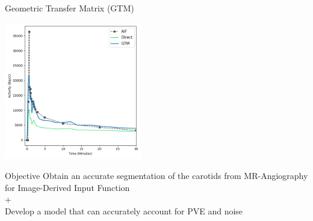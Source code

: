 \documentclass[aspectratio=169]{beamer}
\begin{document}
\begin{frame}[t]{Geometric Transfer Matrix (GTM)}
	\centering
	\begin{center}
		\includegraphics[height=6cm]{BADKA07504_1_bg_fg3.png}

	\end{center}
\end{frame}

\begin{frame}{Objective}
    \centering\Large
    Obtain an accurate segmentation of the carotids from MR-Angiography for Image-Derived Input Function\\
    \pause
    \bigskip
    + \\
    \bigskip
    \Large{Develop a model that can accurately account for PVE and noise}
\end{frame}
\end{document}
